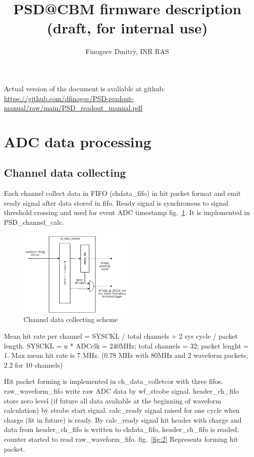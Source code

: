 \documentclass{article}
\title{PSD@CBM firmware description (draft, for internal use)}
\author{Finogeev Dmitry, INR RAS}
\begin{document}
\maketitle

Actual version of the document is avaliable at github:
\newline
\url{https://github.com/dfinogee/PSD-readout-manual/raw/main/PSD_readout_manual.pdf}



\tableofcontents

\newpage

\section{ADC data processing}

\subsection{Channel data collecting}
Each channel collect data in FIFO (chdata\_fifo) in hit packet format and emit ready signal after data stored in fifo. Ready signal is synchronous to signal threshold crossing and used for event ADC timestamp fig.~\ref{fig:1}. It is implemented in PSD\_channel\_calc.

\begin{figure}[H]
	\centering 
	\includegraphics[width=0.5\textwidth]{ADC_event_collection.png}
	\caption{\label{fig:1} Channel data collecting scheme}
\end{figure}
Mean hit rate per channel = SYSCKL / total channels + 2 sys cycle / packet length. SYSCKL = n * ADCclk = 240MHz; total channels = 32; packet lenght = 1. Max mean hit rate is 7 MHz. (0.78 MHz with 80MHz and 2 waveform packets; 2.2 for 10 channels)


Hit packet forming is implemented in ch\_data\_colletcor with three fifos. raw\_waveform\_fifo write raw ADC data by wf\_strobe signal. header\_ch\_fifo store zero level (if future all data avaliable at the beginning of waveform calculation) by strobe start signal. calc\_ready signal raised for one cycle when charge (fit in future) is ready. By calc\_ready signal hit header with charge and data from header\_ch\_fifo is written to chdata\_fifo, header\_ch\_fifo is readed, counter started to read raw\_waveform\_fifo. fig.~\ref{fig:2} Represents forming hit packet.
\end{document}
